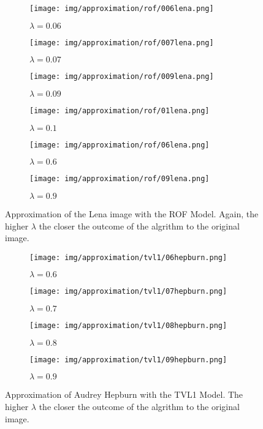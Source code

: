 \begin{figure}[ht]
    \centering
    \begin{subfigure}[b]{0.4\textwidth}
        \texttt{[image: img/approximation/rof/006lena.png]}
        \caption{$\lambda = 0.06$}
    \end{subfigure}
    \begin{subfigure}[b]{0.4\textwidth}
        \texttt{[image: img/approximation/rof/007lena.png]}
        \caption{$\lambda = 0.07$}
    \end{subfigure}
    \begin{subfigure}[b]{0.4\textwidth}
        \texttt{[image: img/approximation/rof/009lena.png]}
        \caption{$\lambda = 0.09$}
    \end{subfigure}
    \begin{subfigure}[b]{0.4\textwidth}
        \texttt{[image: img/approximation/rof/01lena.png]}
        \caption{$\lambda = 0.1$}
    \end{subfigure}
    \begin{subfigure}[b]{0.4\textwidth}
        \texttt{[image: img/approximation/rof/06lena.png]}
        \caption{$\lambda = 0.6$}
    \end{subfigure}
    \begin{subfigure}[b]{0.4\textwidth}
        \texttt{[image: img/approximation/rof/09lena.png]}
        \caption{$\lambda = 0.9$}
    \end{subfigure}
    \caption{Approximation of the Lena image with the ROF Model. Again, the higher $\lambda$ the closer the outcome of the algrithm to the original image.}
\label{fig:rof_lena_compare}
\end{figure}

\begin{figure}[ht]
    \centering
    \begin{subfigure}[b]{0.45\textwidth}
        \texttt{[image: img/approximation/tvl1/06hepburn.png]}
        \caption{$\lambda = 0.6$}
    \end{subfigure}
    \begin{subfigure}[b]{0.45\textwidth}
        \texttt{[image: img/approximation/tvl1/07hepburn.png]}
        \caption{$\lambda = 0.7$}
    \end{subfigure}
    \begin{subfigure}[b]{0.45\textwidth}
        \texttt{[image: img/approximation/tvl1/08hepburn.png]}
        \caption{$\lambda = 0.8$}
    \end{subfigure}
    \begin{subfigure}[b]{0.45\textwidth}
        \texttt{[image: img/approximation/tvl1/09hepburn.png]}
        \caption{$\lambda = 0.9$}
    \end{subfigure}
    \caption{Approximation of Audrey Hepburn with the TVL1 Model. The higher $\lambda$ the closer the outcome of the algrithm to the original image.}
\label{fig:tvl1_hepburn_compare}
\end{figure}

